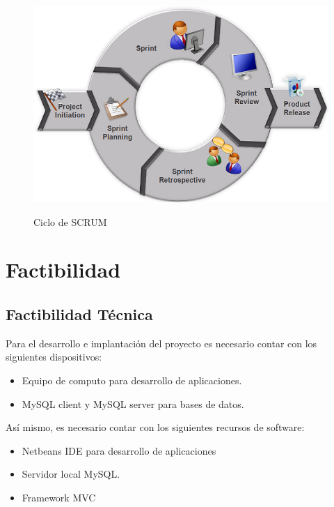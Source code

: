 \begin{landscape}
\begin{figure}[ht] 
\centering
\caption{Ciclo de SCRUM}
\includegraphics[width=1.2\textwidth]{img/scrum_cicle.png}
\label{fig:scrum_cicle}  
\end{figure} 
\end{landscape}

\section{Factibilidad}
\subsection{Factibilidad Técnica}
Para el desarrollo e implantación del proyecto es necesario contar con los siguientes dispositivos:

\begin{itemize}

    \item Equipo de computo para desarrollo de aplicaciones.
    
    \item MySQL client y MySQL server para bases de datos.
    
\end{itemize}

Así mismo, es necesario contar con los siguientes recursos de software:

\begin{itemize}

    \item Netbeans IDE para desarrollo de aplicaciones
    
    \item Servidor local MySQL.
    
    \item Framework MVC
    
\end{itemize}


